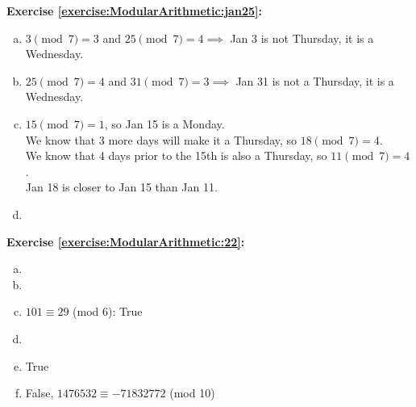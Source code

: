 \noindent\textbf{Exercise \ref{exercise:ModularArithmetic:jan25}:} %
\begin{enumerate}[(a)]
\item
$3\pmod{7} = 3$ and $25\pmod{7} = 4 \implies$ Jan 3 is not Thursday, it is a Wednesday.

\item
$25\pmod{7} = 4$ and $31\pmod{7} = 3 \implies$ Jan 31 is not a Thursday, it is a Wednesday.

\item
$15\pmod{7} = 1$, so Jan 15 is a Monday.\\
We know that 3 more days will make it a Thursday, so $18\pmod{7} = 4$.\\
We know that 4 days prior to the 15th is also a Thursday, so $11\pmod{7} = 4$.\\
Jan 18 is closer to Jan 15 than Jan 11.

\item
\end{enumerate}

\noindent\textbf{Exercise \ref{exercise:ModularArithmetic:22}:}
\begin{enumerate}[(a)]
\item
 
 \item

\item
$101 \equiv 29$ (mod 6): True

\item

\item
True

\item
False, $1476532 \equiv -71832772$ (mod 10)
\end{enumerate}


